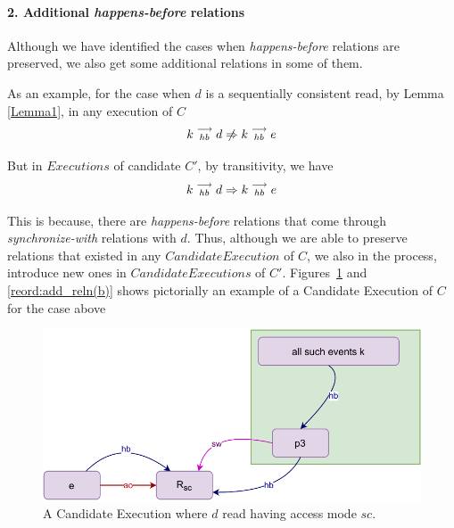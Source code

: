 
\paragraph{2. Additional \textit{happens-before} relations}
    Although we have identified the cases when \textit{happens-before} relations are preserved, we also get some additional relations in some of them.

    As an example, for the case when $d$ is a sequentially consistent read, by Lemma \ref{Lemma1}, in any execution of $C$
    \[
        \reln{k}{hb}{d} \centernot\Rightarrow \reln{k}{hb}{e} 
    \]

    But in $Executions$ of candidate $C'$, by transitivity, we have 
    \[
        k\stackrel{\longrightarrow}{_{hb}}d \Rightarrow k\stackrel{\longrightarrow}{_{hb}}e 
    \]

    This is because, there are \textit{happens-before} relations that come through \textit{synchronize-with} relations with $d$. Thus, although we are able to preserve relations that existed in any $Candidate Execution$ of $C$, we also in the process, introduce new ones in $Candidate Executions$ of $C'$. Figures~\ref{reord:add_reln(a)} and \ref{reord:add_reln(b)} shows pictorially an example of a Candidate Execution of $C$ for the case above 
    \begin{figure}[H]
        \centering
        \includegraphics[scale=0.7]{5.InstructionReordering/4.ValidReorderingCandidate/ProofParts/Part2/part2(c).pdf}
        \caption{A Candidate Execution where $d$ read having access mode $sc$.}
        \label{reord:add_reln(a)}
    \end{figure}

